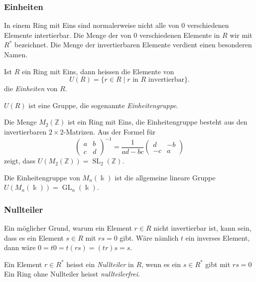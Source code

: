 \subsubsection{Einheiten}
In einem Ring mit Eins sind normalerweise nicht alle von $0$ verschiedenen
Elemente intertierbar.
Die Menge der von $0$ verschiedenen Elemente in $R$ wir mit $R^*$
bezeichnet.
%
Die Menge der invertierbaren Elemente verdient einen besonderen Namen.

\begin{definition}
Ist $R$ ein Ring mit Eins, dann heissen die Elemente von
\[
U(R) = \{ r\in R \;|\; \text{$r$ in $R$ invertierbar}\}.
\]
die {\em Einheiten} von $R$.
%
\end{definition}

\begin{satz}
$U(R)$ ist eine Gruppe, die sogenannte {\em Einheitengruppe}.
%
\end{satz}

\begin{beispiel}
Die Menge $M_2(\mathbb{Z})$ ist ein Ring mit Eins, die Einheitengruppe
besteht aus den invertierbaren $2\times 2$-Matrizen. 
Aus der Formel für 
\[
\begin{pmatrix}
a&b\\
c&d
\end{pmatrix}^{-1}
=
\frac{1}{ad-bc}\begin{pmatrix}
d&-b\\
-c&a
\end{pmatrix}
\]
zeigt, dass $U(M_2(\mathbb{Z})) = \operatorname{SL}_2(\mathbb{Z})$.
\end{beispiel}

\begin{beispiel}
Die Einheitengruppe von $M_n(\Bbbk)$ ist die allgemeine lineare Gruppe 
$U(M_n(\Bbbk))=\operatorname{GL}_n(\Bbbk)$.
\end{beispiel}

\subsubsection{Nullteiler}
Ein möglicher Grund, warum ein Element $r\in R$ nicht invertierbar
ist, kann sein, dass es ein Element $s\in R$ mit $rs=0$ gibt.
Wäre nämlich $t$ ein inverses Element, dann wäre $0=t0 = t(rs) = (tr)s=s$.

\begin{definition}
\label{buch:grundlagen:def:nullteiler}
Ein Element $r\in R^*$ heisst ein {\em Nullteiler} in $R$,
wenn es ein $s\in R^*$ gibt mit $rs=0$
Ein Ring ohne Nullteiler heisst {\em nullteilerfrei}.
\end{definition}
%
%

